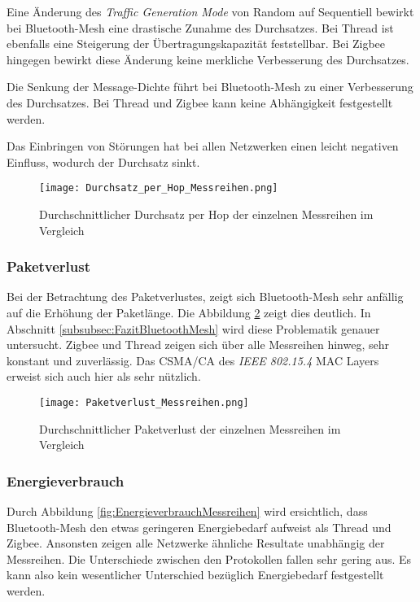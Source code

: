 Eine Änderung des \textit{Traffic Generation Mode} von Random auf Sequentiell bewirkt bei Bluetooth-Mesh eine drastische Zunahme des Durchsatzes.
Bei Thread ist ebenfalls eine Steigerung der Übertragungskapazität feststellbar.
Bei Zigbee hingegen bewirkt diese Änderung keine merkliche Verbesserung des Durchsatzes.

Die Senkung der Message-Dichte führt bei Bluetooth-Mesh zu einer Verbesserung des Durchsatzes. Bei Thread und Zigbee kann keine Abhängigkeit festgestellt werden.

Das Einbringen von Störungen hat bei allen Netzwerken einen leicht negativen Einfluss, wodurch der Durchsatz sinkt. 

\begin{figure}[H]
	\centering
	\texttt{[image: Durchsatz\_per\_Hop\_Messreihen.png]}
	\caption{Durchschnittlicher Durchsatz per Hop der einzelnen Messreihen im Vergleich}\label{fig:Durchsätze_per_Hop_Messreihen}
\end{figure}

\subsubsection{Paketverlust}\label{subsec:VergleichPaketverlustMessreihen}
Bei der Betrachtung des Paketverlustes, zeigt sich Bluetooth-Mesh sehr anfällig auf die Erhöhung der Paketlänge.
Die Abbildung \ref{fig:PaketverlusteMessreihen} zeigt dies deutlich.
In Abschnitt \ref{subsubsec:FazitBluetoothMesh} wird diese Problematik genauer untersucht.
Zigbee und Thread zeigen sich über alle Messreihen hinweg, sehr konstant und zuverlässig.
Das CSMA\slash CA des \textit{IEEE 802.15.4} MAC Layers erweist sich auch hier als sehr nützlich.


\begin{figure}
	\centering
	\texttt{[image: Paketverlust\_Messreihen.png]}
	\caption{Durchschnittlicher Paketverlust der einzelnen Messreihen im Vergleich}\label{fig:PaketverlusteMessreihen}
\end{figure}

\newpage
\subsubsection{Energieverbrauch}\label{subsec:VergleichEnergieverbrauchMessreihen}
Durch Abbildung \ref{fig:EnergieverbrauchMessreihen} wird ersichtlich, dass Bluetooth-Mesh den etwas geringeren Energiebedarf aufweist als Thread und Zigbee. Ansonsten zeigen alle Netzwerke ähnliche Resultate unabhängig der Messreihen.
Die Unterschiede zwischen den Protokollen fallen sehr gering aus.
Es kann also kein wesentlicher Unterschied bezüglich Energiebedarf festgestellt werden.

